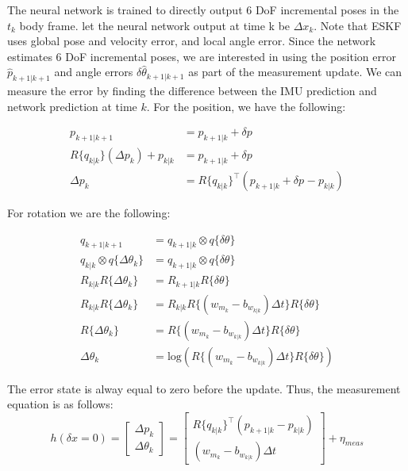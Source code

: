 \documentclass[]{article}
\begin{document}
The neural network is trained to directly output 6 DoF incremental poses in the $t_k$ body frame. let the neural network output at time k be $\Delta x_k$. Note that ESKF uses global pose and velocity error, and local angle error. Since the network estimates 6 DoF incremental poses, we are interested in using the position error $\hat{p}_{k+1|k+1}$ and angle errors $\delta \hat{\theta}_{k+1|k+1}$ as part of the measurement update. We can measure the error by finding the difference between the IMU prediction and network prediction at time $k$. For the position, we have the following:

\begin{align}
p_{k+1|k+1} &= p_{k+1|k} + \delta p \\
R\{q_{k|k}\}(\Delta p_k) + p_{k|k} &= p_{k+1|k} + \delta p \\
\Delta p_k &= R\{q_{k|k}\}^{\intercal}(p_{k+1|k} + \delta p_{} - p_{k|k})
\end{align}

For rotation we are the following:

\begin{align}
q_{k+1|k+1} &= q_{k+1|k} \otimes q\{\delta \theta\} \\
q_{k|k} \otimes q\{\Delta \theta_k\} &= q_{k+1|k} \otimes q\{\delta \theta\} \\
R_{k|k} R\{\Delta \theta_k\} &= R_{k+1|k} R\{\delta \theta\} \\
R_{k|k} R\{\Delta \theta_k\} &= R_{k|k} R\{(w_{m_k}-b_{w_{k|k}}) \Delta t\} R\{\delta \theta\} \\
R\{\Delta \theta_k\} &= R\{(w_{m_k}-b_{w_{k|k}}) \Delta t\} R\{\delta \theta\} \\
\Delta \theta_k &= \mathrm{log}(R\{(w_{m_k}-b_{w_{k|k}}) \Delta t\} R\{\delta \theta\})
\end{align}

The error state is alway equal to zero before the update. Thus, the measurement equation is as follows:
\begin{equation}
h(\delta x = 0) = 
\begin{bmatrix}
\Delta p_k \\
\Delta \theta_k
\end{bmatrix} =
\begin{bmatrix}
R\{q_{k|k}\}^{\intercal}(p_{k+1|k} - p_{k|k}) \\
(w_{m_k}-b_{w_{k|k}}) \Delta t
\end{bmatrix} + \eta_{meas}
\end{equation}
\end{document}
